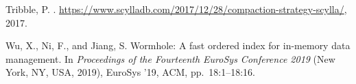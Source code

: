 \documentclass[sigplan,10pt]{acmart}
\begin{document}
\begin{thebibliography}{10}
{\sc Tribble, P.}
.
\newblock
  \url{https://www.scylladb.com/2017/12/28/compaction-strategy-scylla/}, 2017.

{\sc Wu, X., Ni, F., and Jiang, S.}
\newblock Wormhole: A fast ordered index for in-memory data management.
\newblock In {\em Proceedings of the Fourteenth EuroSys Conference 2019\/} (New
  York, NY, USA, 2019), EuroSys '19, ACM, pp.~18:1--18:16.

\end{thebibliography}


\end{document}
